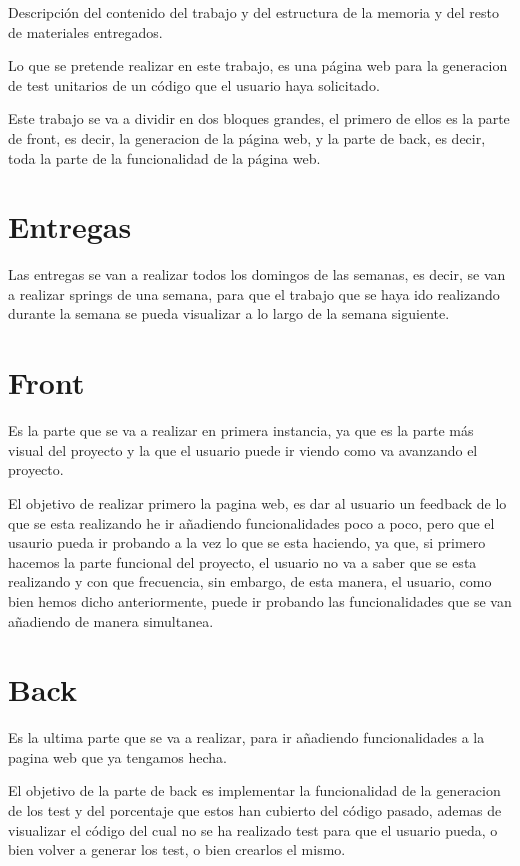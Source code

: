 
Descripción del contenido del trabajo y del estructura de la memoria y del resto de materiales entregados.

Lo que se pretende realizar en este trabajo, es una página web para la generacion de test unitarios de un código que el usuario haya solicitado.

Este trabajo se va a dividir en dos bloques grandes, el primero de ellos es la parte de front, es decir, la generacion de la página web, y la parte de back, es decir, toda la parte de la funcionalidad de la página web.

\section*{Entregas}

Las entregas se van a realizar todos los domingos de las semanas, es decir, se van a realizar springs de una semana, para que el trabajo que se haya ido realizando durante la semana se pueda visualizar a lo largo de la semana siguiente.

\section*{Front}

Es la parte que se va a realizar en primera instancia, ya que es la parte más visual del proyecto y la que el usuario puede ir viendo como va avanzando el proyecto. 

El objetivo de realizar primero la pagina web, es dar al usuario un feedback de lo que se esta realizando he ir añadiendo funcionalidades poco a poco, pero que el usaurio pueda ir probando a la vez lo que se esta haciendo, ya que, si primero hacemos la parte funcional del proyecto, el usuario no va a saber que se esta realizando y con que frecuencia, sin embargo, de esta manera, el usuario, como bien hemos dicho anteriormente, puede ir probando las funcionalidades que se van añadiendo de manera simultanea.

\section*{Back}

Es la ultima parte que se va a realizar, para ir añadiendo funcionalidades a la pagina web que ya tengamos hecha.

El objetivo de la parte de back es implementar la funcionalidad de la generacion de los test y del porcentaje que estos han cubierto del código pasado, ademas de visualizar el código del cual no se ha realizado test para que el usuario pueda, o bien volver a generar los test, o bien crearlos el mismo.
